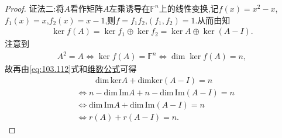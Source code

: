 \documentclass[../../main.tex]{subfiles}
\begin{document}
\begin{proof}
{\color{blue}证法二:}将$A$看作矩阵$A$左乘诱导在$\mathbb{F}^n$上的线性变换,记$f(x)=x^2-x$,$f_1(x)=x$,$f_2(x)=x-1$,则$f=f_1f_2$,$(f_1,f_2)=1$.从而由知
\begin{align}
\ker f(A) = \ker f_1 \oplus \ker f_2 = \ker A \oplus \ker (A - I). \label{eq:103.112}
\end{align}
注意到
\begin{align*}
A^2 = A \Longleftrightarrow \ker f(A) = \mathbb{F}^n \Longleftrightarrow \dim \ker f(A) = n,
\end{align*}
故再由\eqref{eq:103.112}式和\hyperref[theorem:值域和核空间维数之和等于原像空间维数]{维数公式}可得
\begin{align*}
&\qquad \,\, \mathrm{dim}\,\mathrm{ker}A+\mathrm{dimker}\left( A-I \right) =n
\\
&\Longleftrightarrow n-\mathrm{dim}\,\mathrm{Im}A+n-\mathrm{dim}\,\mathrm{Im}\left( A-I \right) =n
\\
&\Longleftrightarrow \mathrm{dim}\,\mathrm{Im}A+\mathrm{dim}\,\mathrm{Im}\left( A-I \right) =n
\\
&\Longleftrightarrow r\left( A \right) +r\left( A-I \right) =n.
\end{align*}
\end{proof}
\end{document}
